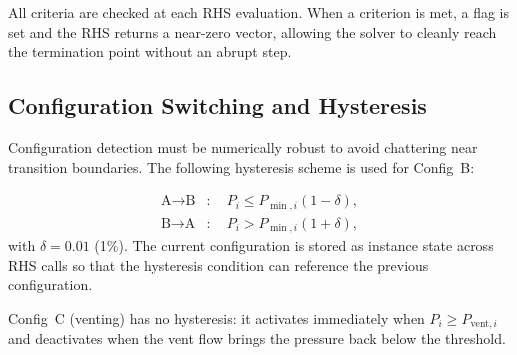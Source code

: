 All criteria are checked at each RHS evaluation.  When a criterion is met, a
flag is set and the RHS returns a near-zero vector, allowing the solver to
cleanly reach the termination point without an abrupt step.

\subsection{Configuration Switching and Hysteresis}
\label{sec:method:hysteresis}

Configuration detection must be numerically robust to avoid chattering near
transition boundaries.  The following hysteresis scheme is used for Config~B:

\begin{align}
  \text{A} \to \text{B} &: \quad P_i \le P_{\min,i}(1 - \delta), \\
  \text{B} \to \text{A} &: \quad P_i >  P_{\min,i}(1 + \delta),
\end{align}
with $\delta = 0.01$ (1\%).  The current configuration is stored as instance
state across RHS calls so that the hysteresis condition can reference the
previous configuration.

Config~C (venting) has no hysteresis: it activates immediately when
$P_i \ge P_{\text{vent},i}$ and deactivates when the vent flow brings the
pressure back below the threshold.
